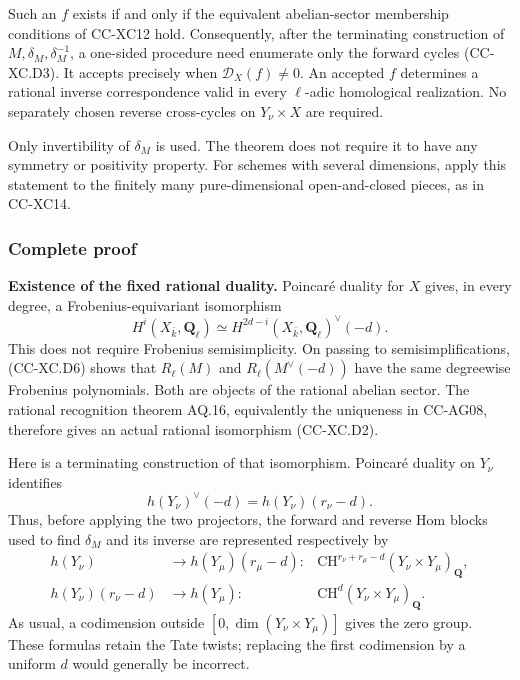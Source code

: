 Such an \(f\) exists if and only if the equivalent abelian-sector
membership conditions of CC-XC12 hold. Consequently, after the
terminating construction of \(M,\delta_M,\delta_M^{-1}\), a one-sided
procedure need enumerate only the forward cycles (CC-XC.D3). It accepts
precisely when \(\mathcal D_X(f)\ne0\). An accepted \(f\) determines a
rational inverse correspondence valid in every \(\ell\)-adic homological
realization. No separately chosen reverse cross-cycles on
\(Y_\nu\times X\) are required.

Only invertibility of \(\delta_M\) is used. The theorem does not require
it to have any symmetry or positivity property. For schemes with several
dimensions, apply this statement to the finitely many pure-dimensional
open-and-closed pieces, as in CC-XC14.

\subsubsection{Complete proof}\label{complete-proof}

\textbf{Existence of the fixed rational duality.} Poincaré duality for
\(X\) gives, in every degree, a Frobenius-equivariant isomorphism \[
 H^i(X_{\bar k},\mathbf Q_\ell)
      \simeq
 H^{2d-i}(X_{\bar k},\mathbf Q_\ell)^\vee(-d).
                                                        \tag{CC-XC.D6}
\] This does not require Frobenius semisimplicity. On passing to
semisimplifications, (CC-XC.D6) shows that \(R_\ell(M)\) and
\(R_\ell(M^\vee(-d))\) have the same degreewise Frobenius polynomials.
Both are objects of the rational abelian sector. The rational
recognition theorem AQ.16, equivalently the uniqueness in CC-AG08,
therefore gives an actual rational isomorphism (CC-XC.D2).

Here is a terminating construction of that isomorphism. Poincaré duality
on \(Y_\nu\) identifies \[
 h(Y_\nu)^\vee(-d)=h(Y_\nu)(r_\nu-d).
 \] Thus, before applying the two projectors, the forward and reverse
Hom blocks used to find \(\delta_M\) and its inverse are represented
respectively by \[
 \begin{aligned}
 h(Y_\nu)&\longrightarrow h(Y_\mu)(r_\mu-d):
 &\mathrm{CH}^{r_\nu+r_\mu-d}
                       (Y_\nu\times Y_\mu)_{\mathbf Q},\\
 h(Y_\nu)(r_\nu-d)&\longrightarrow h(Y_\mu):
 &\mathrm{CH}^{d}
                       (Y_\nu\times Y_\mu)_{\mathbf Q}.
 \end{aligned}                                         \tag{CC-XC.D7}
\] As usual, a codimension outside \([0,\dim(Y_\nu\times Y_\mu)]\) gives
the zero group. These formulas retain the Tate twists; replacing the
first codimension by a uniform \(d\) would generally be incorrect.

